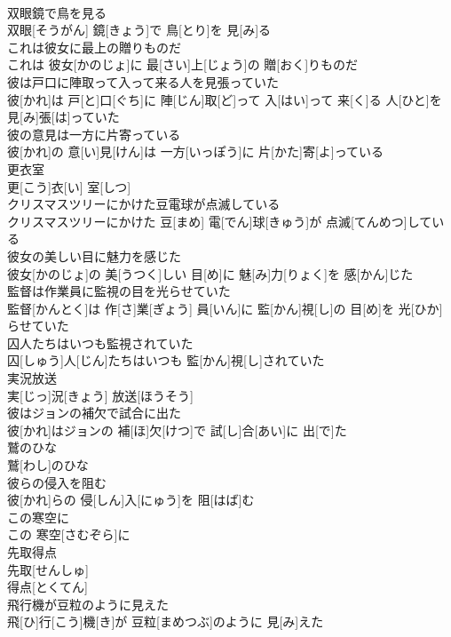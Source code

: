 \documentclass[8pt]{extreport}
\begin{document}
\begin{CJK}{UTF8}{min}
\\	双眼鏡で鳥を見る	
\\	双眼[そうがん] 鏡[きょう]で 鳥[とり]を 見[み]る
\\	これは彼女に最上の贈りものだ	
\\	これは 彼女[かのじょ]に 最[さい]上[じょう]の 贈[おく]りものだ
\\	彼は戸口に陣取って入って来る人を見張っていた	
\\	彼[かれ]は 戸[と]口[ぐち]に 陣[じん]取[ど]って 入[はい]って 来[く]る 人[ひと]を 見[み]張[は]っていた
\\	彼の意見は一方に片寄っている	
\\	彼[かれ]の 意[い]見[けん]は 一方[いっぽう]に 片[かた]寄[よ]っている
\\	更衣室	
\\	更[こう]衣[い] 室[しつ]
\\	クリスマスツリーにかけた豆電球が点滅している	
\\	クリスマスツリーにかけた 豆[まめ] 電[でん]球[きゅう]が 点滅[てんめつ]している
\\	彼女の美しい目に魅力を感じた	
\\	彼女[かのじょ]の 美[うつく]しい 目[め]に 魅[み]力[りょく]を 感[かん]じた
\\	監督は作業員に監視の目を光らせていた	
\\	監督[かんとく]は 作[さ]業[ぎょう] 員[いん]に 監[かん]視[し]の 目[め]を 光[ひか]らせていた
\\	囚人たちはいつも監視されていた	
\\	囚[しゅう]人[じん]たちはいつも 監[かん]視[し]されていた
\\	実況放送	
\\	実[じっ]況[きょう] 放送[ほうそう]
\\	彼はジョンの補欠で試合に出た	
\\	彼[かれ]はジョンの 補[ほ]欠[けつ]で 試[し]合[あい]に 出[で]た
\\	鷲のひな	
\\	鷲[わし]のひな
\\	彼らの侵入を阻む	
\\	彼[かれ]らの 侵[しん]入[にゅう]を 阻[はば]む
\\	この寒空に	
\\	この 寒空[さむぞら]に
\\	先取得点	
\\	先取[せんしゅ]
\\	得点[とくてん]
\\	飛行機が豆粒のように見えた	
\\	飛[ひ]行[こう]機[き]が 豆粒[まめつぶ]のように 見[み]えた

\end{CJK}
\end{document}
